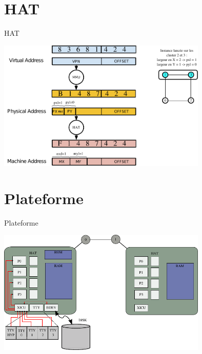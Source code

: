 \documentclass[12pt,francais]{beamer}
\begin{document}
\section*{HAT}
\begin{frame}{HAT}
        \begin{center}
                \includegraphics[width=10cm]{thirdlayer.pdf}
        \end{center}
\end{frame}


\section*{Plateforme}
\begin{frame}{Plateforme}
        \begin{center}
                \includegraphics[width=10cm]{platform_simple.pdf}
        \end{center}
\end{frame}
\end{document}
